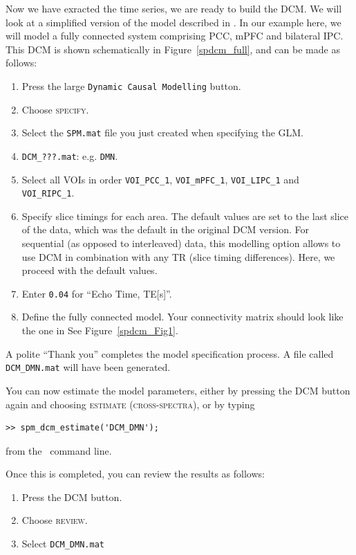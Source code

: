 Now we have exracted the time series, we are ready to build the DCM. We will look at a simplified version of the model described in \cite{rsDCM2015}.  In our example here, we will model a fully connected system comprising PCC, mPFC and bilateral IPC. This DCM is shown schematically in Figure~\ref{spdcm_full}, and can be made as follows:
\begin{enumerate}
 \item Press the large \texttt{Dynamic Causal Modelling} button.
 \item Choose \textsc{specify}.
 \item Select the \texttt{SPM.mat} file you just created when specifying the GLM.
 \item \texttt{DCM\_???.mat}: e.g. \texttt{DMN}.
 \item Select all VOIs in order \texttt{VOI\_PCC\_1}, \texttt{VOI\_mPFC\_1}, \texttt{VOI\_LIPC\_1} and  \texttt{VOI\_RIPC\_1}.
 \item Specify slice timings for each area. The default values are set to the last slice of the data, which was the default in the original DCM version. For sequential (as opposed to interleaved) data, this modelling option allows to use DCM in combination with any TR (slice timing differences). Here, we proceed with the default values.
\item Enter \texttt{0.04} for ``Echo Time, TE[s]''.
\item Define the fully connected model. Your connectivity matrix should look like the one in See Figure~\ref{spdcm_Fig1}.
\end{enumerate}
A polite ``Thank you'' completes the model specification process. A file called \texttt{DCM\_DMN.mat} will have been generated.

You can now estimate the model parameters, either by pressing the DCM button again and choosing \textsc{estimate (cross-spectra)}, or by typing
\begin{verbatim}
>> spm_dcm_estimate('DCM_DMN');
\end{verbatim}
from the \matlab\ command line.

Once this is completed, you can review the results as follows:
\begin{enumerate}
\item Press the DCM button.
\item Choose \textsc{review}.
\item Select \texttt{DCM\_DMN.mat}
\end{enumerate}

